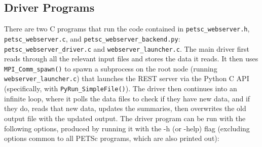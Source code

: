 \subsection*{Driver Programs}
There are two C programs that run the code contained in \lstinline{petsc_webserver.h}, \lstinline{petsc_webserver.c}, and \lstinline{petsc_webserver_backend.py}: \lstinline{petsc_webserver_driver.c} and \lstinline{webserver_launcher.c}. The main driver first reads through all the relevant input files and stores the data it reads. It then uses \lstinline{MPI_Comm_spawn()} to spawn a subprocess on the root node (running \lstinline{webserver_launcher.c}) that launches the REST server via the Python C API (specifically, with \lstinline{PyRun_SimpleFile()}). The driver then continues into an infinite loop, where it polls the data files to check if they have new data, and if they do, reads that new data, updates the summaries, then overwrites the old output file with the updated output. The driver program can be run with the following options, produced by running it with the -h (or -help) flag (excluding options common to all PETSc programs, which are also printed out):
